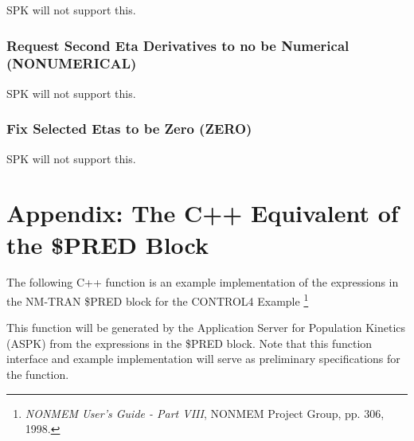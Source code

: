 \documentclass{article}
\begin{document}
SPK will not support this.


\subsubsection{Request Second Eta Derivatives to no be Numerical (NONUMERICAL)}

SPK will not support this.


\subsubsection{Fix Selected Etas to be Zero (ZERO)}

SPK will not support this.


%
%

\appendix
\newpage


%
\section{Appendix: The C++ Equivalent of the \$PRED Block}
%

\label{App:CppVersionOfPred}

The following C++ function is an example implementation of
the expressions in the NM-TRAN \$PRED block for the CONTROL4
Example
\footnote{
  {\em NONMEM User's Guide - Part VIII}, NONMEM Project Group, 
  pp. 306, 1998.
} 

This function will be generated by the Application Server for
Population Kinetics (ASPK) from the expressions in the \$PRED block.
Note that this function interface and example implementation will serve as
preliminary specifications for the function.
\end{document}
